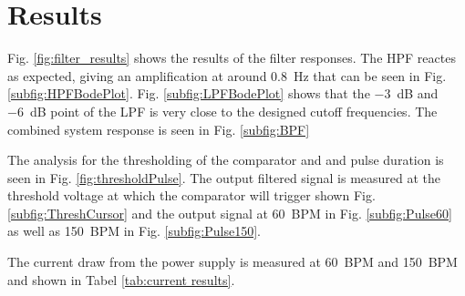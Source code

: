    

 
 
\section{Results} \label{sec:heartResults}
Fig. \ref{fig:filter_results} shows the results of the filter responses. The HPF reactes as expected, giving an amplification at around \SI{0.8}{\hertz} that can be seen in Fig. \ref{subfig:HPFBodePlot}. Fig. \ref{subfig:LPFBodePlot} shows that the \SI{-3}{\deci\bel} and \SI{-6}{\deci\bel} point of the LPF is very close to the designed cutoff frequencies. The combined system response is seen in Fig. \ref{subfig:BPF}\par
The analysis for the thresholding of the comparator and and pulse duration is seen in Fig. \ref{fig:thresholdPulse}. The output filtered signal is measured at the threshold voltage at which the comparator will trigger shown Fig. \ref{subfig:ThreshCursor} and the output signal at \SI{60}{BPM} in Fig. \ref{subfig:Pulse60} as well as \SI{150}{BPM} in Fig. \ref{subfig:Pulse150}.\par
The current draw from the power supply is measured at \SI{60}{BPM} and \SI{150}{BPM} and shown in Tabel \ref{tab:current results}.


